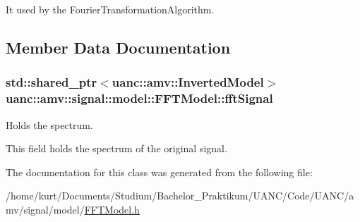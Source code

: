 It used by the Fourier\+Transformation\+Algorithm. 

\subsection{Member Data Documentation}
\subsubsection[{\texorpdfstring{fft\+Signal}{fftSignal}}]{\setlength{\rightskip}{0pt plus 5cm}std\+::shared\+\_\+ptr$<${\bf uanc\+::amv\+::\+Inverted\+Model}$>$ uanc\+::amv\+::signal\+::model\+::\+F\+F\+T\+Model\+::fft\+Signal}\hypertarget{classuanc_1_1amv_1_1signal_1_1model_1_1_f_f_t_model_a1a63228d3c06b13ffb95038823fac3ae}{}\label{classuanc_1_1amv_1_1signal_1_1model_1_1_f_f_t_model_a1a63228d3c06b13ffb95038823fac3ae}


Holds the spectrum. 

This field holds the spectrum of the original signal. 

The documentation for this class was generated from the following file\+:\begin{DoxyCompactItemize}
\item 
/home/kurt/\+Documents/\+Studium/\+Bachelor\+\_\+\+Praktikum/\+U\+A\+N\+C/\+Code/\+U\+A\+N\+C/amv/signal/model/\hyperlink{_f_f_t_model_8h}{F\+F\+T\+Model.\+h}\end{DoxyCompactItemize}
